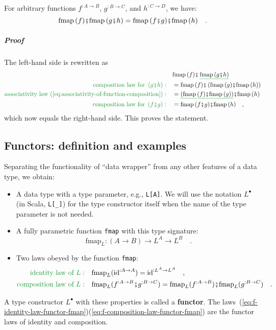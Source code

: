 For arbitrary functions $f^{:A\rightarrow B}$, $g^{:B\rightarrow C}$,
and $h^{:C\rightarrow D}$, we have:
\[
\text{fmap}\,(f)\bef\text{fmap}\,(g\bef h)=\text{fmap}\,(f\bef g)\bef\text{fmap}\,(h)\quad.
\]


\subparagraph{Proof}

The left-hand side is rewritten as
\begin{align*}
 & \text{fmap}\,(f)\bef\,\gunderline{\text{fmap}\,(g\bef h)}\\
{\color{greenunder}\text{composition law for }\left(g\bef h\right):}\quad & =\text{fmap}\,(f)\bef\left(\text{fmap}\,(g)\bef\text{fmap}\,(h)\right)\\
{\color{greenunder}\text{associativity law (\ref{eq:associativity-of-function-composition})}:}\quad & =\gunderline{\left(\text{fmap}\,(f)\bef\text{fmap}\,(g)\right)}\bef\text{fmap}\,(h)\\
{\color{greenunder}\text{composition law for }\left(f\bef g\right):}\quad & =\text{fmap}\,(f\bef g)\bef\text{fmap}\,(h)\quad,
\end{align*}
which now equals the right-hand side. This proves the statement.

\subsection{Functors: definition and examples\label{subsec:Functors:-definition-and-examples}}

Separating the functionality of \textsf{``}data wrapper\textsf{''} from any other
features of a data type, we obtain:
\begin{itemize}
\item A data type with a type parameter, e.g., \lstinline!L[A]!. We will
use the notation $L^{\bullet}$ (in Scala, \lstinline!L[_]!) for
the type constructor itself when the name of the type parameter is
not needed.
\item A fully parametric function \lstinline!fmap!
with this type signature:
\[
\text{fmap}_{L}:\left(A\rightarrow B\right)\rightarrow L^{A}\rightarrow L^{B}\quad.
\]
\item Two laws obeyed by the function \lstinline!fmap!:
\begin{align}
{\color{greenunder}\text{identity law of }L:}\quad & \text{fmap}_{L}(\text{id}^{:A\rightarrow A})=\text{id}^{:L^{A}\rightarrow L^{A}}\quad,\label{eq:f-identity-law-functor-fmap}\\
{\color{greenunder}\text{composition law of }L:}\quad & \text{fmap}_{L}(f^{:A\rightarrow B}\bef g^{:B\rightarrow C})=\text{fmap}_{L}(f^{:A\rightarrow B})\bef\text{fmap}_{L}(g^{:B\rightarrow C})\quad.\label{eq:f-composition-law-functor-fmap}
\end{align}
\end{itemize}
A type constructor $L^{\bullet}$ with these properties is called
a \textbf{functor}. The laws~(\ref{eq:f-identity-law-functor-fmap})\textendash (\ref{eq:f-composition-law-functor-fmap})
are the functor laws of identity and composition. 

